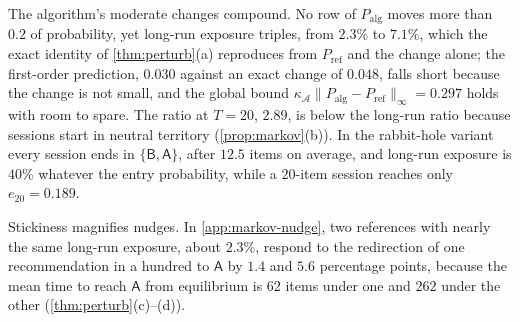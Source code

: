 The algorithm's moderate changes compound. No row of $P_{\mathrm{alg}}$ moves more than $0.2$ of probability, yet long-run exposure triples, from $2.3\%$ to $7.1\%$, which the exact identity of \cref{thm:perturb}(a) reproduces from $P_{\mathrm{ref}}$ and the change alone; the first-order prediction, $0.030$ against an exact change of $0.048$, falls short because the change is not small, and the global bound $\kappa_{\mathcal A}\|P_{\mathrm{alg}}-P_{\mathrm{ref}}\|_\infty=0.297$ holds with room to spare. The ratio at $T=20$, $2.89$, is below the long-run ratio because sessions start in neutral territory (\cref{prop:markov}(b)). In the rabbit-hole variant every session ends in $\{\mathsf B,\mathsf A\}$, after $12.5$ items on average, and long-run exposure is $40\%$ whatever the entry probability, while a $20$-item session reaches only $e_{20}=0.189$.

Stickiness magnifies nudges. In \cref{app:markov-nudge}, two references with nearly the same long-run exposure, about $2.3\%$, respond to the redirection of one recommendation in a hundred to $\mathsf A$ by $1.4$ and $5.6$ percentage points, because the mean time to reach $\mathsf A$ from equilibrium is $62$ items under one and $262$ under the other (\cref{thm:perturb}(c)--(d)).
\FloatBarrier
